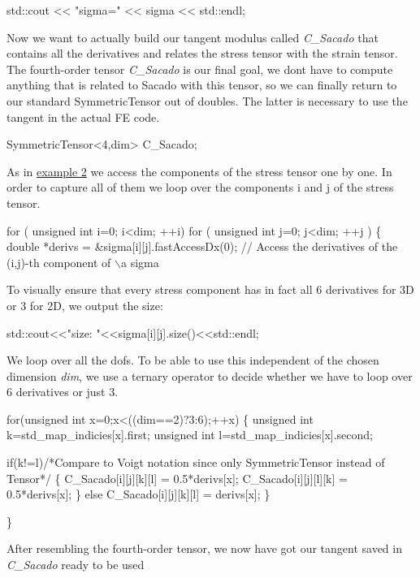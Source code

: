 \begin{DoxyCode}
std::cout << \textcolor{stringliteral}{"sigma="} << sigma << std::endl;
\end{DoxyCode}
 Now we want to actually build our tangent modulus called {\itshape C\+\_\+\+Sacado} that contains all the derivatives and relates the stress tensor with the strain tensor. ~\newline
The fourth-\/order tensor {\itshape C\+\_\+\+Sacado} is our final goal, we don\textquotesingle{}t have to compute anything that is related to Sacado with this tensor, so we can finally return to our standard Symmetric\+Tensor out of doubles. The latter is necessary to use the tangent in the actual FE code. 
\begin{DoxyCode}
SymmetricTensor<4,dim> C\_Sacado;
\end{DoxyCode}
 As in \hyperlink{index_Ex2}{example 2} we access the components of the stress tensor one by one. In order to capture all of them we loop over the components i and j of the stress tensor. 
\begin{DoxyCode}
\textcolor{keywordflow}{for} ( \textcolor{keywordtype}{unsigned} \textcolor{keywordtype}{int} i=0; i<dim; ++i)
    \textcolor{keywordflow}{for} ( \textcolor{keywordtype}{unsigned} \textcolor{keywordtype}{int} j=0; j<dim; ++j )
    \{
        \textcolor{keywordtype}{double} *derivs = &sigma[i][j].fastAccessDx(0); \textcolor{comment}{// Access the derivatives of the (i,j)-th component
       of \(\backslash\)a sigma}
\end{DoxyCode}
 To visually ensure that every stress component has in fact all 6 derivatives for 3D or 3 for 2D, we output the size\+: 
\begin{DoxyCode}
std::cout<<\textcolor{stringliteral}{"size: "}<<sigma[i][j].size()<<std::endl;
\end{DoxyCode}
 We loop over all the dofs. To be able to use this independent of the chosen dimension {\itshape dim}, we use a ternary operator to decide whether we have to loop over 6 derivatives or just 3. 
\begin{DoxyCode}
    \textcolor{keywordflow}{for}(\textcolor{keywordtype}{unsigned} \textcolor{keywordtype}{int} x=0;x<((dim==2)?3:6);++x)
    \{
        \textcolor{keywordtype}{unsigned} \textcolor{keywordtype}{int} k=std\_map\_indicies[x].first;
        \textcolor{keywordtype}{unsigned} \textcolor{keywordtype}{int} l=std\_map\_indicies[x].second;

        \textcolor{keywordflow}{if}(k!=l)\textcolor{comment}{/*Compare to Voigt notation since only SymmetricTensor instead of Tensor*/}
        \{
            C\_Sacado[i][j][k][l] = 0.5*derivs[x];
            C\_Sacado[i][j][l][k] = 0.5*derivs[x];
        \}
        \textcolor{keywordflow}{else}
            C\_Sacado[i][j][k][l] = derivs[x];
    \}            

\}
\end{DoxyCode}
 After resembling the fourth-\/order tensor, we now have got our tangent saved in {\itshape C\+\_\+\+Sacado} ready to be used


